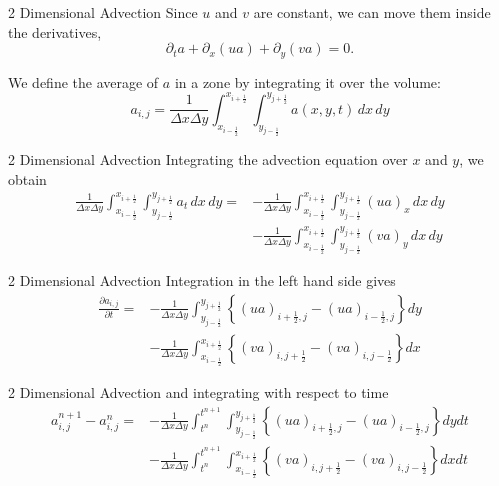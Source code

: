 \documentclass[11pt]{beamer}
\begin{document}
\begin{frame}[fragile]{2 Dimensional Advection}
Since $u$ and $v$ are constant, we can
move them inside the derivatives,
\begin{equation}
\partial_t a + \partial_x (u a) + \partial_y (v a) = 0.
\end{equation}

We 
define the average of $a$ in a zone by integrating it over the
volume:
\begin{equation}
a_{i,j} = \frac{1}{\Delta x \Delta y} 
   \int_{x_{i-\frac{1}{2}}}^{x_{i+\frac{1}{2}}} \int_{y_{j-\frac{1}{2}}}^{y_{j+\frac{1}{2}}} 
   a(x,y,t) \, dx \, dy
\end{equation}
\end{frame}

\begin{frame}[fragile]{2 Dimensional Advection}
Integrating the advection equation over $x$ and $y$, we obtain
\begin{align}
\frac{1}{\Delta x \Delta y} 
  \int_{x_{i-\frac{1}{2}}}^{x_{i+\frac{1}{2}}} 
  \int_{y_{j-\frac{1}{2}}}^{y_{j+\frac{1}{2}}} a_t \, dx \, dy =  
  &- \frac{1}{\Delta x \Delta y}
       \int_{x_{i-\frac{1}{2}}}^{x_{i+\frac{1}{2}}} \int_{y_{j-\frac{1}{2}}}^{y_{j+\frac{1}{2}}}
      (u a)_x \, dx \, dy \nonumber \\
  &- \frac{1}{\Delta x \Delta y}
       \int_{x_{i-\frac{1}{2}}}^{x_{i+\frac{1}{2}}} \int_{y_{j-\frac{1}{2}}}^{y_{j+\frac{1}{2}}}
      (v a)_y \, dx \, dy 
\end{align}
\end{frame}

\begin{frame}[fragile]{2 Dimensional Advection}
Integration in the left hand side gives
\begin{align}
 \frac{\partial a_{i,j}}{\partial t} =
  &- \frac{1}{\Delta x\Delta y} \int_{y_{j-\frac{1}{2}}}^{y_{j+\frac{1}{2}}}
     \left \{ (u a)_{i+\frac{1}{2},j} - (u a)_{i-\frac{1}{2},j} \right \} dy \nonumber \\
  &- \frac{1}{\Delta x\Delta y} \int_{x_{i-\frac{1}{2}}}^{x_{i+\frac{1}{2}}}
     \left \{ (v a)_{i,j+\frac{1}{2}} - (v a)_{i,j-\frac{1}{2}} \right \} dx
\end{align}
\end{frame}

\begin{frame}[fragile]{2 Dimensional Advection}
and integrating with respect to time 
\begin{align}
 a_{i,j}^{n+1} - a_{i,j}^n = 
  &- \frac{1}{\Delta x\Delta y} \int_{t^n}^{t^{n+1}} \int_{y_{j-\frac{1}{2}}}^{y_{j+\frac{1}{2}}}
     \left \{ (u a)_{i+\frac{1}{2},j} - (u a)_{i-\frac{1}{2},j} \right \} dy dt \nonumber \\
  &- \frac{1}{\Delta x\Delta y} \int_{t^n}^{t^{n+1}} \int_{x_{i-\frac{1}{2}}}^{x_{i+\frac{1}{2}}}
     \left \{ (v a)_{i,j+\frac{1}{2}} - (v a)_{i,j-\frac{1}{2}} \right \} dx dt
\end{align}
\end{frame}
\end{document}
